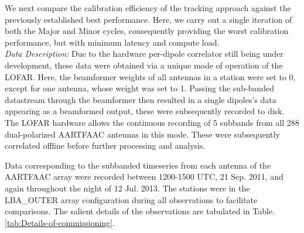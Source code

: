 \documentclass{aa}
\begin{document}
We next compare the calibration  efficiency of the tracking approach against the
previously established best  performance. Here, we carry out  a single iteration
of both the Major and Minor cycles, consequently providing the worst calibration
performance,   but  with   minimum  latency   and  compute   load.\\  \emph{Data
  Description: }  Due to  the hardware per-dipole  correlator still  being under
development, these  data were  obtained via  a unique mode  of operation  of the
LOFAR. Here, the beamformer weights of all  antennas in a station were set to 0,
except  for one  antenna, whose  weight  was set  to 1.  Passing the  sub-banded
datastream  through the  beamformer then  resulted  in a  single dipoles's  data
appearing as a beamformed output,  these were subsequently recorded to disk. The
LOFAR  hardware allows  the  continuous recording  of  5 subbands  from all  288
dual-polarized  AARTFAAC  antennas  in   this  mode.   These  were  subsequently
correlated offline before further processing and analysis.

Data corresponding to the subbanded timeseries from each antenna of the AARTFAAC
array were  recorded between 1200-1500 UTC,  21 Sep. 2011,  and again throughout
the  night  of  12  Jul.  2013.   The stations  were  in  the  LBA\_OUTER  array
configuration  during all  observations to  facilitate comparisons.  The salient
details       of       the       observations       are       tabulated       in
Table. \ref{tab:Details-of-commissioning}.

\begin{table}[tbh]

\caption{\label{tab:Details-of-commissioning}Details of commissioning observations
carried out with the AARTFAAC }
\end{table}
\end{document}
